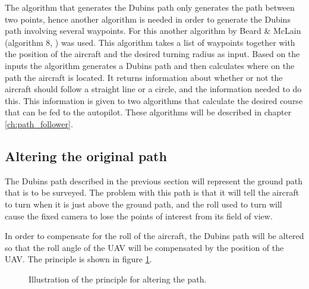 The algorithm that generates the Dubins path only generates the path between two points, hence another algorithm is needed in order to generate the Dubins path involving several waypoints. For this another algorithm by Beard \& McLain (algorithm 8, \cite{suaBEARD}) was used. This algorithm takes a list of waypoints together with the position of the aircraft and the desired turning radius as input. Based on the inputs the algorithm generates a Dubins path and then calculates where on the path the aircraft is located. It returns information about whether or not the aircraft should follow a straight line or a circle, and the information needed to do this. This information is given to two algorithms that calculate the desired course that can be fed to the autopilot. These algorithms will be described in chapter \ref{ch:path_follower}.


\subsection{Altering the original path}

The Dubins path described in the previous section will represent the ground path that is to be surveyed. The problem with this path is that it will tell the aircraft to turn when it is just above the ground path, and the roll used to turn will cause the fixed camera to lose the points of interest from its field of view. 

In order to compensate for the roll of the aircraft, the Dubins path will be altered so that the roll angle of the UAV will be compensated by the position of the UAV. The principle is shown in figure \ref{fig:altered_path}. 

\begin{figure}[]
    \centering
    \caption{Illustration of the principle for altering the path.}
	\label{fig:altered_path}
\end{figure}


